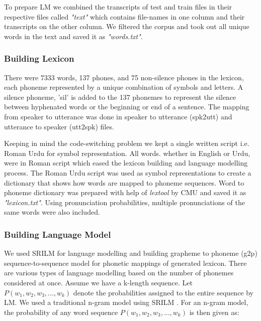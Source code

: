 \documentclass[a4paper, 11pt]{article}
\begin{document}
To prepare LM we combined the transcripts of test and train files in their respective files called \textit{"text"} which contains file-names in one column and their transcripts on the other column. We filtered the corpus and took out all unique words in the text and saved it as \textit{"words.txt"}. %

\subsubsection{Building Lexicon}
There were 7333 words, 137 phones, and 75 non-silence phones in the lexicon, each phoneme represented by a unique combination of symbols and letters. A silence phoneme, 'sil' is added to the 137 phonemes to represent the silence between hyphenated words or the beginning or end of a sentence. The mapping from speaker to utterance was done in speaker to utterance (spk2utt) and utterance to speaker (utt2spk) files.

Keeping in mind the code-switching problem we kept a single written script i.e. Roman Urdu for symbol representation. All words. whether in English or Urdu, were in Roman script which eased the lexicon building and language modelling process. The Roman Urdu script was used as symbol representations to create a dictionary that shows how words are mapped to phoneme sequences. Word to phoneme dictionary was prepared with help of \textit{lextool} by CMU \cite{cmu_cmu_nodate} and saved it as \textit{"lexicon.txt"}. Using pronunciation probabilities, multiple pronunciations of the same words were also included.  

\subsubsection{Building Language Model}

We used SRILM \cite{andreas_stolcke_srilm_2002} for language modelling and building grapheme to phoneme (g2p) sequence-to-sequence model for phonetic mappings of generated lexicon. There are various types of language modelling based on the number of phonemes considered at once. Assume we have a k-length sequence. Let $P(w_{1}, w_{2}, w_{3},..., w_{k})$ denote the probabilities assigned to the entire sequence by LM. We used a traditional n-gram model using SRILM \cite{andreas_stolcke_srilm_2002}. For an n-gram model, the probability of any word sequence $P(w_{1}, w_{2}, w_{3},..., w_{k})$ is then given as:
\end{document}
